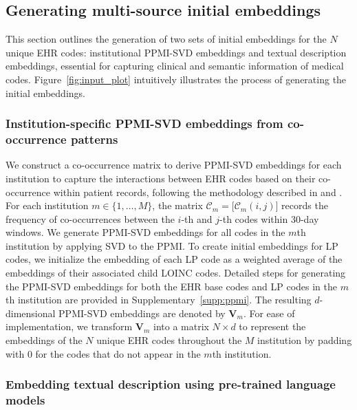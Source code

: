 \documentclass{article}
\def\Csc{\mathcal{C}}
\def\V{\mathbf{V}}
\begin{document}
\subsection{Generating multi-source initial embeddings}
\label{sec:initial embed} 


This section outlines the generation of two sets of initial embeddings for the $N$ unique EHR codes: institutional PPMI-SVD embeddings and textual description embeddings, essential for capturing clinical and semantic information of medical codes. Figure~\ref{fig:input_plot} intuitively illustrates the process of generating the initial embeddings.


\subsubsection{Institution-specific PPMI-SVD embeddings from co-occurrence patterns}
\label{sec:PPMI emb}
We construct a co-occurrence matrix to derive PPMI-SVD embeddings for each institution to capture the interactions between EHR codes based on their co-occurrence within patient records, following the methodology described in \cite{beam2018clinical} and \cite{hong2021clinical}. For each institution $m \in \{1, \ldots, M\}$, the matrix $\Csc_m = \big[\Csc_m(i,j)\big]$ records the frequency of co-occurrences between the $i$-th and $j$-th codes within $30$-day windows. We generate PPMI-SVD embeddings for all codes in the $m$th institution by applying SVD to the PPMI. To create initial embeddings for LP codes, we initialize the embedding of each LP code as a weighted average of the embeddings of their associated child LOINC codes. Detailed steps for generating the PPMI-SVD embeddings for both the EHR base codes and LP codes in the $m$th institution are provided in Supplementary~\ref{supp:ppmi}. The resulting $d$-dimensional PPMI-SVD embeddings are denoted by $\V_{m}$. For ease of implementation, we transform $\V_m$ into a matrix $N\times d$ to represent the embeddings of the $N$ unique EHR codes throughout the $M$ institution by padding with $0$ for the codes that do not appear in the $m$th institution. 



\subsubsection{Embedding textual description using pre-trained language models} 
\label{sec:predesc}
\end{document}
